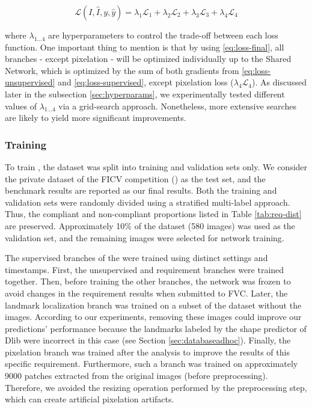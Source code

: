 \begin{equation}
\label{eq:loss-final}
\mathcal{L}(I, \hat{I}, y, \hat{y}) = \lambda_1\mathcal{L}_1 + \lambda_2\mathcal{L}_2 + \lambda_3\mathcal{L}_3 + \lambda_4\mathcal{L}_4
\end{equation}
 
\noindent where $\lambda_{1...4}$ are hyperparameters to control the trade-off between each loss function. One important thing to mention is that by using \autoref{eq:loss-final}, all branches - except pixelation - will be optimized individually up to the Shared Network, which is optimized by the sum of both gradients from \autoref{eq:loss-unsupervised} and \autoref{eq:loss-supervised}, except pixelation loss ($\lambda_4\mathcal{L}_4$). As discussed later in the subsection \ref{sec:hyperparams}, we experimentally tested different values of $\lambda_{1...4}$ via a grid-search approach. Nonetheless, more extensive searches are likely to yield more significant improvements.
 
\subsubsection{Training} 
 
To train \methodname, the \adhoc dataset was split into training and validation sets only. We consider the private dataset of the FICV competition (\ficvofficial) as the test set, and the benchmark results are reported as our final results. Both the training and validation sets were randomly divided using a stratified multi-label approach. Thus, the compliant and non-compliant proportions listed in Table \ref{tab:req-dist} are preserved. Approximately 10\% of the dataset (580 images) was used as the validation set, and the remaining images were selected for network training.
 
The supervised branches of the \methodname were trained using distinct settings and timestamps. First, the unsupervised and requirement branches were trained together. Then, before training the other branches, the network was frozen to avoid changes in the requirement results when submitted to FVC. Later, the landmark localization branch was trained on a subset of the \adhoc dataset without the \darktintedlenses images. According to our experiments, removing these images could improve our predictions' performance because the landmarks labeled by the shape predictor of Dlib were incorrect in this case (see Section \ref{sec:databaseadhoc}). Finally, the pixelation branch was trained after the analysis to improve the results of this specific requirement. Furthermore, such a branch was trained on approximately 9000 patches extracted from the original images (before preprocessing). Therefore, we avoided the resizing operation performed by the preprocessing step, which can create artificial pixelation artifacts.
 
